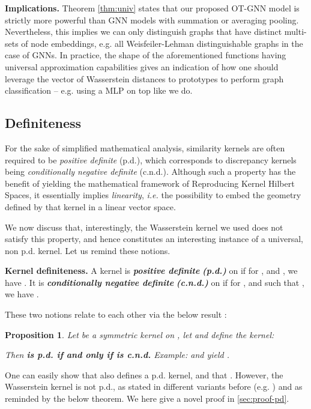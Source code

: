 \documentclass[letterpaper]{article} \usepackage{aaai22}  \usepackage{times}  \usepackage{helvet}  \usepackage{courier}  \usepackage[hyphens]{url}  \usepackage{graphicx} \urlstyle{rm} \def\UrlFont{\rm}  \usepackage{natbib}  \usepackage{caption} \DeclareCaptionStyle{ruled}{labelfont=normalfont,labelsep=colon,strut=off} \frenchspacing  \setlength{\pdfpagewidth}{8.5in}  \setlength{\pdfpageheight}{11in}  \usepackage{algorithm}
\newtheorem{proposition}{Proposition}
\begin{document}
\textbf{Implications. } Theorem \ref{thm:univ} states that our proposed OT-GNN model is strictly more powerful than GNN models with summation or averaging pooling. Nevertheless, this implies we can only distinguish graphs that have distinct multi-sets of node embeddings, e.g. all Weisfeiler-Lehman distinguishable graphs in the case of GNNs. In practice, the shape of the aforementioned functions having universal approximation capabilities gives an indication of how one should leverage the vector of Wasserstein distances to prototypes to perform graph classification -- e.g. using a MLP on top like we do.


\subsection{Definiteness}

For the sake of simplified mathematical analysis, similarity kernels are often required to be \textit{positive definite} (p.d.), which corresponds to discrepancy kernels being \textit{conditionally negative definite} (c.n.d.). Although such a property has the benefit of yielding the mathematical framework of Reproducing Kernel Hilbert Spaces, it essentially implies \textit{linearity}, \textit{i.e.} the possibility to embed the geometry defined by that kernel in a linear vector space. 

We now discuss that, interestingly, the Wasserstein kernel we used does not satisfy this property, and hence constitutes an interesting instance of a universal, non p.d. kernel. Let us remind these notions.

\noindent\textbf{Kernel definiteness.} A kernel  is \textbf{\textit{positive definite}} \textit{\textbf{(p.d.)}} on  if for ,  and , we have . It is \textbf{\textit{conditionally negative definite}} \textit{\textbf{(c.n.d.)}} on  if for ,  and  such that , we have . 

These two notions relate to each other via the below result \cite{boughorbel2005conditionally}:

\begin{proposition}\label{prop:cnd} Let  be a symmetric kernel on , let  and define the kernel:

Then  \textbf{is p.d. if and only if  is c.n.d.} Example:  and  yield .
\end{proposition}


One can easily show that  also defines a p.d. kernel, and that . However, the Wasserstein kernel is not p.d., as stated in different variants before (e.g. \cite{vert2008optimal}) and as reminded by the below theorem. We here give a novel proof in \cref{sec:proof-pd}.
\end{document}
